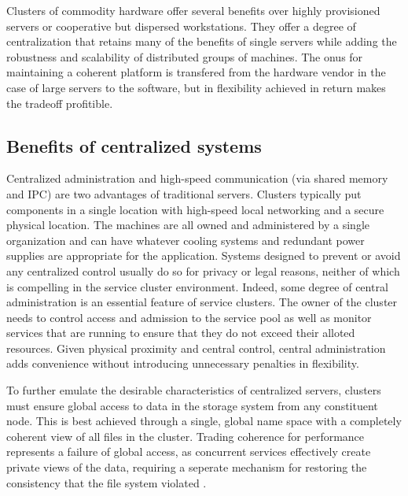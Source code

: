 Clusters of commodity hardware offer several benefits over highly provisioned servers or cooperative but dispersed workstations. They offer a degree of centralization that retains many of the benefits of single servers while adding the robustness and scalability of distributed groups of machines. The onus for maintaining a coherent platform is transfered from the hardware vendor in the case of large servers to the software, but in flexibility achieved in return makes the tradeoff profitible.

\subsection{Benefits of centralized systems}

Centralized administration and high-speed communication (via shared memory and IPC) are two advantages of traditional servers. Clusters typically put components in a single location with high-speed local networking and a secure physical location. The machines are all owned and administered by a single organization and can have whatever cooling systems and redundant power supplies are appropriate for the application. Systems designed to prevent or avoid any centralized control usually do so for privacy or legal reasons, neither of which is compelling in the service cluster environment. Indeed, some degree of central administration is an essential feature of service clusters. The owner of the cluster needs to control access and admission to the service pool as well as monitor services that are running to ensure that they do not exceed their alloted resources. Given physical proximity and central control, central administration adds convenience without introducing unnecessary penalties in flexibility.

To further emulate the desirable characteristics of centralized servers, clusters must ensure global access to data in the storage system from any constituent node. This is best achieved through a single, global name space with a completely coherent view of all files in the cluster. Trading coherence for performance represents a failure of global access, as concurrent services effectively create private views of the data, requiring a seperate mechanism for restoring the consistency that the file system violated \cite{birrell93}.

